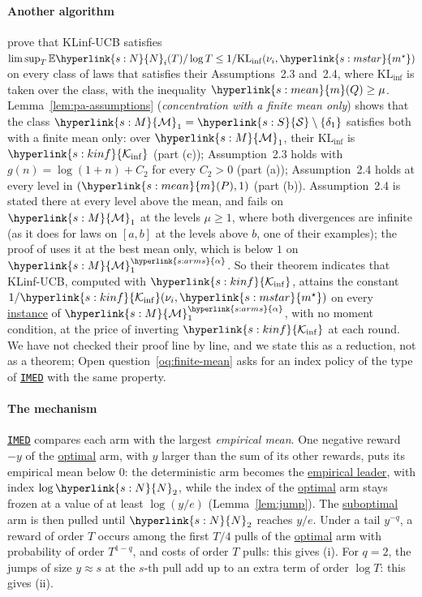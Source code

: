 \documentclass[11pt]{article}
\newcommand{\E}{\mathbb{E}}
\newcommand{\sy}[2]{{\hyperlink{#1}{#2}}}
\newcommand{\term}[2]{\hyperlink{#1}{#2}}
\newcommand{\imed}{\hyperref[alg:imed]{\texttt{IMED}}}
\newcommand{\Sm}{\sy{s:S}{\mathcal{S}}}
\newcommand{\Mm}{\sy{s:M}{\mathcal{M}}}
\newcommand{\mean}{\sy{s:mean}{m}}
\newcommand{\arms}{\sy{s:arms}{\alpha}}
\newcommand{\ms}{\sy{s:mstar}{m^{\star}}}
\newcommand{\Kinf}{\sy{s:kinf}{\mathcal{K}_{\inf}}}
\newcommand{\Np}{\sy{s:N}{N}}
\begin{document}
\paragraph{Another algorithm} \citet[Theorem~3.1]{PA26} prove that KLinf-UCB satisfies
$\limsup_T\E\Np_i(T)/\log T\le1/\mathrm{KL}_{\inf}(\nu_i,\ms)$ on every class of laws that satisfies
their Assumptions~2.3 and~2.4, where $\mathrm{KL}_{\inf}$ is taken over the class, with the
inequality $\mean(Q)\ge\mu$. Lemma~\ref{lem:pa-assumptions} (\emph{concentration with a finite mean
only}) shows that the class $\Mm_1=\Sm\setminus\{\delta_1\}$ satisfies both with a finite mean only:
over $\Mm_1$, their $\mathrm{KL}_{\inf}$ is $\Kinf$ (part (c)); Assumption~2.3 holds with
$g(n)=\log(1+n)+C_2$ for every $C_2>0$ (part (a)); Assumption~2.4 holds at every level in
$(\mean(P),1)$ (part (b)). Assumption~2.4 is stated there at every level above the mean, and fails on
$\Mm_1$ at the levels $\mu\ge1$, where both divergences are infinite (as it does for laws on $[a,b]$
at the levels above $b$, one of their examples); the proof of \citet[Theorem~3.1]{PA26} uses it at
the best mean only, which is below $1$ on $\Mm_1^\arms$. So their theorem indicates that KLinf-UCB,
computed with $\Kinf$, attains the constant $1/\Kinf(\nu_i,\ms)$ on every \term{w:instance}{instance} of
$\Mm_1^\arms$, with no moment condition, at the price of inverting $\Kinf$ at each round. We have not
checked their proof line by line, and we state this as a reduction, not as a theorem;
Open question~\ref{oq:finite-mean} asks for an index policy of the type of \imed{} with the same
property.

\paragraph{The mechanism} \imed{} compares each arm with the largest \emph{empirical mean}.
One negative reward $-y$ of the \term{w:optimal}{optimal} arm, with $y$ larger than the sum of its other rewards, puts
its empirical mean below $0$: the deterministic arm becomes the \term{w:leader}{empirical leader}, with index
$\log \Np_2$, while the index of the \term{w:optimal}{optimal} arm stays frozen at a value of at least $\log(y/e)$
(Lemma~\ref{lem:jump}). The \term{w:subopt}{suboptimal} arm is then pulled until $\Np_2$ reaches $y/e$. Under a tail
$y^{-q}$, a reward of order $T$ occurs among the first $T/4$ pulls of the \term{w:optimal}{optimal} arm with probability
of order $T^{1-q}$, and costs of order $T$ pulls: this gives (i). For $q=2$, the jumps of size
$y\approx s$ at the $s$-th pull add up to an extra term of order $\log T$: this gives (ii).
\end{document}
